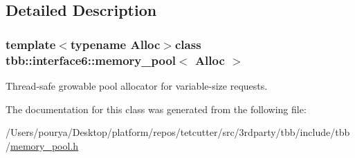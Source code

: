 \subsection{Detailed Description}
\subsubsection*{template$<$typename Alloc$>$class tbb\+::interface6\+::memory\+\_\+pool$<$ Alloc $>$}

Thread-\/safe growable pool allocator for variable-\/size requests. 

The documentation for this class was generated from the following file\+:\begin{DoxyCompactItemize}
\item 
/\+Users/pourya/\+Desktop/platform/repos/tetcutter/src/3rdparty/tbb/include/tbb/\hyperlink{memory__pool_8h}{memory\+\_\+pool.\+h}\end{DoxyCompactItemize}
